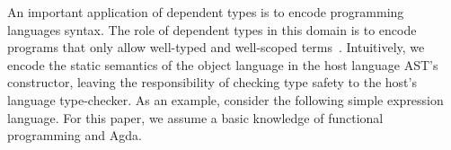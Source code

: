 \documentclass[sigconf]{acmart}
\theoremstyle{definition}
\newcommand{\D}[1]{\blue{\mathsf{#1}}}
\newcommand{\Con}[1]{\red{\mathsf{#1}}}
\newcommand{\F}[1]{\green{\mathsf{#1}}}
\begin{document}


An important application of dependent types is to encode programming languages
syntax. The role of dependent types in this domain is to encode programs that
only allow well-typed and well-scoped terms~\cite{Benton2012}. Intuitively, we encode
the static semantics of the object language in the host language AST's
constructor, leaving the responsibility of checking type safety to the
host's language type-checker. As an example, consider the following simple
expression language. For this paper, we assume a basic knowledge of functional
programming and Agda. %
\end{document}
